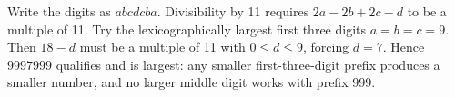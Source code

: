 Write the digits as $abc dcba$. Divisibility by 11 requires $2a-2b+2c-d$ to be a multiple of 11. Try the lexicographically largest first three digits $a=b=c=9$. Then $18-d$ must be a multiple of 11 with $0\le d\le9$, forcing $d=7$. Hence $\boxed{9997999}$ qualifies and is largest: any smaller first-three-digit prefix produces a smaller number, and no larger middle digit works with prefix 999.
